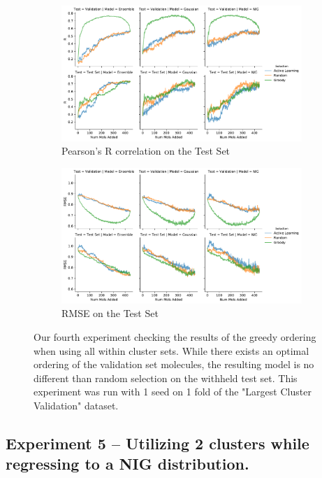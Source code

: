 \documentclass[journal=jmcmar,manuscript=article]{achemso}
\begin{document}
\begin{figure}[tbph]
    \centering
    \begin{subfigure}[b]{0.48\textwidth}
        \includegraphics[width=1\linewidth]{figures/fig4a_lc_greed_withvalid_R.pdf}
        \caption{Pearson's R correlation on the Test Set}
    \end{subfigure}%
    \hfill
    \begin{subfigure}[b]{0.48\textwidth}
        \includegraphics[width=1\linewidth]{figures/fig4a_lc_greed_withvalid_RMSE.pdf}
        \caption{RMSE on the Test Set}
    \end{subfigure}
    \caption{Our fourth experiment checking the results of the greedy ordering when using all within cluster sets. While there exists an optimal ordering of the validation set molecules, the resulting model is no different than random selection on the withheld test set. This experiment was run with 1 seed on 1 fold of the "Largest Cluster Validation" dataset.}
    \label{fig:lcgreedvalid}
\end{figure}

\subsection{Experiment 5 -- Utilizing 2 clusters while regressing to a NIG distribution.}
\end{document}

